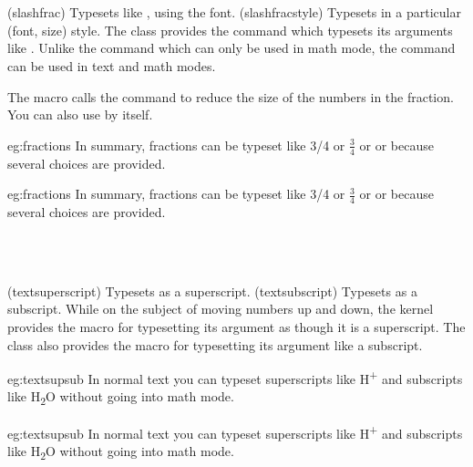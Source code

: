 \begin{syntax}
\cmd{\slashfrac} \\
\cmd{\slashfracstyle} \\
\end{syntax}
\glossary(slashfrac)%
  {}%
  {Typesets like , using the  font.}
\glossary(slashfracstyle)%
  {}%
  {Typesets  in a particular (font, size) style.}
The class provides the \cmd{\slashfrac} command which typesets its
arguments like . Unlike the \cmd{\frac} command which
can only be used in math mode, the \cmd{\slashfrac} command can be
used in text and math modes.

    The \cmd{\slashfrac} macro calls the \cmd{\slashfracstyle} command to
reduce the size of the numbers in the fraction. You can also use
\cmd{\slashfracstyle} by itself.
\begin{egsource}{eg:fractions}
In summary, fractions can be typeset like 3/4 or $\frac{3}{4}$
or  or  because several choices
are provided.
\end{egsource}
\begin{egresult}{eg:fractions}
In summary, fractions can be typeset like 3/4 or $\frac{3}{4}$
or  or  because several choices
are provided.
\end{egresult}

\begin{syntax}
\cmd{\textsuperscript} \\
\cmd{\textsubscript} \\
\end{syntax}
\glossary(textsuperscript)%
  {}%
  {Typesets  as a superscript.}
\glossary(textsubscript)%
  {}%
  {Typesets  as a subscript.}
While on the subject of moving numbers up and down, the kernel provides
the \cmd{\textsuperscript} macro for typesetting its argument as though it
is a superscript. The class also provides the \cmd{\textsubscript} macro
for typesetting its argument like a subscript.

\begin{egsource}{eg:textsupsub}
In normal text you can typeset superscripts like H\textsuperscript{+} and 
subscripts like H\textsubscript{2}O without going into math mode.
\end{egsource}
\begin{egresult}{eg:textsupsub}
In normal text you can typeset superscripts like H\textsuperscript{+} and 
subscripts like H\textsubscript{2}O without going into math mode.
\end{egresult}

